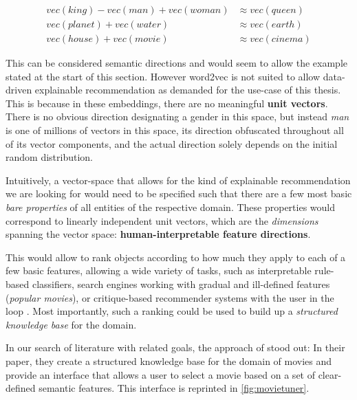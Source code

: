 \setlength{\belowdisplayskip}{3pt}
\vspace{-6.5ex}
\begin{align}
    vec(king) - vec(man) + vec(woman) &\approx vec(queen) \nonumber \\ 
    vec(planet) + vec(water) &\approx vec(earth)  \label{eq:w2vregularity}\\
    vec(house) + vec(movie) &\approx vec(cinema) \nonumber
\end{align}

This can be considered semantic directions and would seem to allow the example stated at the start of this section. However \gls{word2vec} is not suited to allow data-driven explainable recommendation as demanded for the use-case of this thesis. This is because in these embeddings, there are no meaningful \textbf{unit vectors}. There is no obvious direction designating a gender in this space, but instead \textit{man} is one of millions of vectors in this space, its direction obfuscated throughout all of its vector components, and the actual direction solely depends on the initial random distribution. 

Intuitively, a vector-space that allows for the kind of explainable recommendation we are looking for would need to be specified such that there are a few most basic \textit{bare properties} of all entities of the respective domain. These properties would correspond to linearly independent unit vectors, which are the \textit{dimensions} spanning the vector space: \textbf{human-interpretable feature directions}.

This would allow to rank objects according to how much they apply to each of a few basic features, allowing a wide variety of tasks, such as interpretable rule-based classifiers, search engines working with gradual and ill-defined features (\eg \textit{popular movies}), or critique-based recommender systems with the user in the loop \cite{Ager2018}. Most importantly, such a ranking could be used to build up a \textit{structured knowledge base} for the domain.

In our search of literature with related goals, the approach of \cite{VISR12} stood out: In their paper, they create a structured knowledge base for the domain of movies and provide an interface that allows a user to select a movie based on a set of clear-defined semantic features. This interface is reprinted in \autoref{fig:movietuner}.


